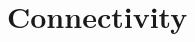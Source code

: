 \documentclass[12pt]{article}
\begin{document}
\begin{enumerate}[(a)]

%
%
%        

\end{enumerate}

\section{Connectivity}
\end{document}
